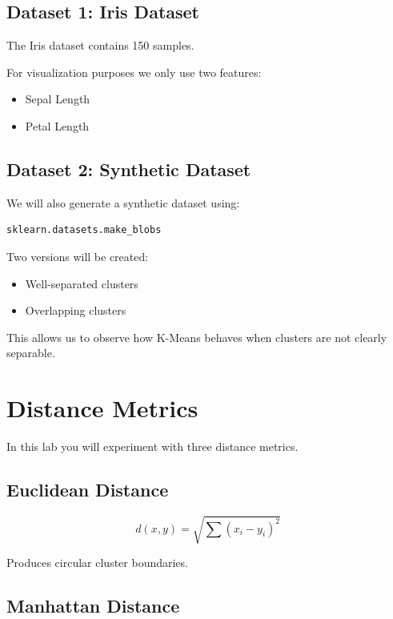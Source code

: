 \documentclass[12pt,a4paper]{article}
\begin{document}
\subsection{Dataset 1: Iris Dataset}

The Iris dataset contains 150 samples.

For visualization purposes we only use two features:

\begin{itemize}
\item Sepal Length
\item Petal Length
\end{itemize}

\subsection{Dataset 2: Synthetic Dataset}

We will also generate a synthetic dataset using:

\begin{verbatim}
sklearn.datasets.make_blobs
\end{verbatim}

Two versions will be created:

\begin{itemize}
\item Well-separated clusters
\item Overlapping clusters
\end{itemize}

This allows us to observe how K-Means behaves when clusters are not clearly separable.


\section{Distance Metrics}

In this lab you will experiment with three distance metrics.

\subsection{Euclidean Distance}

\[
d(x,y) = \sqrt{\sum (x_i - y_i)^2}
\]

Produces circular cluster boundaries.

\subsection{Manhattan Distance}
\end{document}
